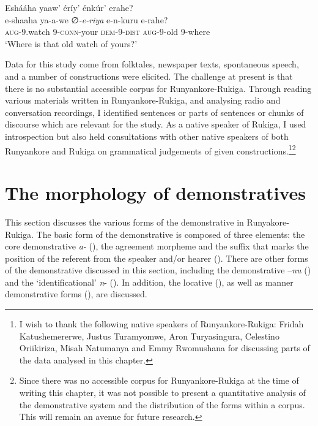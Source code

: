 \documentclass[output=paper 		  ]{langscibook}
\begin{document}
\ea%
    \label{ex:asiimwe:4}
          Eshááha yaaw’ éríy’ énkúr’ erahe?\\
\gll  e-shaaha  ya-a-we  ∅\emph{{}-e-riya}  e-n-kuru  e-rahe? \\
  \textsc{aug}{}-9.watch  9-\textsc{conn}{}-your  \textsc{dem-}9-\textsc{dist}  \textsc{aug}{}-9-old  9-where\\
\glt ‘Where is that old watch of yours?’
\z

Data for this study come from folktales, newspaper texts, spontaneous speech, and a number of constructions were elicited. The challenge at present is that there is no substantial accessible corpus for Run\-yan\-ko\-re-Ru\-ki\-ga. Through reading various materials written in Run\-yan\-ko\-re-Ru\-ki\-ga, and analysing radio and conversation recordings, I identified sentences or parts of sentences or chunks of discourse which are relevant for the study. As a native speaker of Rukiga, I used introspection but also held consultations with other native speakers of both Runyankore and Rukiga on grammatical judgements of given constructions.\footnote{I wish to thank the following native speakers of Run\-yan\-ko\-re-Ru\-ki\-ga: Fridah Katushemererwe, Justus Turamyomwe, Aron Turyasingura, Celestino Oriikiriza, Misah Natumanya and Emmy Rwomushana for discussing parts of the data analysed in this chapter.}\footnote{Since there was no accessible corpus for Run\-yan\-ko\-re-Ru\-ki\-ga at the time of writing this chapter, it was not possible to present a quantitative analysis of the demonstrative system and the distribution of the forms within a corpus. This will remain an avenue for future research.}

\section{The morphology of demonstratives}
\label{sec:asiimwe:2}

This section discusses the various forms of the demonstrative in Runyakore-Rukiga. The basic form of the demonstrative is composed of three elements: the core demonstrative \textit{a-} (), the agreement morpheme and the suffix that marks the position of the referent from the speaker and/or hearer (). There are other forms of the demonstrative discussed in this section, including the demonstrative –\textit{nu} () and the ‘identificational’ \textit{n}{}- (). In addition, the locative (), as well as manner demonstrative forms (), are discussed.
\end{document}
